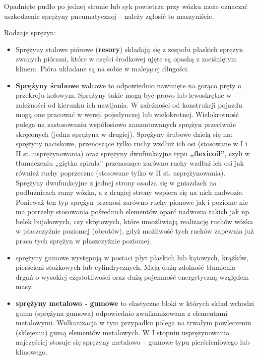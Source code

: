 \begin{tcolorbox}[colback=yellow!10!white,colframe=orange!80!black,title=Dla drużyny]
	Opadnięte pudło po jednej stronie lub syk powietrza przy wózku może oznaczać uszkodzenie sprężyny pneumatycznej – należy zgłosić to maszyniście.
\end{tcolorbox}

Rodzaje sprężyn:
\begin{itemize}
	\item Sprężyny stalowe piórowe (\textbf{resory}) składają się z zespołu płaskich sprężyn zwanych piórami, które w części środkowej ujęte są opaską z zaciśniętym klinem. Pióra układane są na sobie w malejącej długości.
	\item \textbf{Sprężyny śrubowe} walcowe to odpowiednio nawinięte na gorąco pręty o przekroju kołowym. Sprężyny takie mogą być prawo lub lewoskrętne w zależności od kierunku ich nawijania. 
	W zależności od konstrukcji pojazdu mogą one pracować w wersji pojedynczej lub wielokrotnej. Wielokrotność polega na zastosowaniu współosiowo zamontowanych sprężyn przeciwnie skręconych (jedna sprężyna w drugiej). 
	Sprężyny śrubowe dzielą się na: sprężyny naciskowe, przenoszące tylko ruchy wzdłuż ich osi (stosowane w I i II st. usprężynowania) oraz sprężyny dwufunkcyjne typu \textbf{„flexicoil”}, czyli w tłumaczeniu „giętka spirala” przenoszące zarówno ruchy wzdłuż ich osi jak również ruchy poprzeczne (stosowane tylko w II st. usprężynowania). 
	Sprężyny dwufunkcyjne z jednej strony osadza się w gniazdach na podłużnicach ramy wózka, a z drugiej strony wspiera się na nich nadwozie. Ponieważ ten typ sprężyn przenosi zarówno ruchy pionowe jak i poziome nie ma potrzeby stosowania pośrednich elementów oparć nadwozia takich jak np. belek bujakowych, czy skrętowych, które umożliwiają realizację ruchów wózka w płaszczyźnie poziomej (obrotów), gdyż możliwość tych ruchów zapewnia już praca tych sprężyn w płaszczyźnie poziomej.
	\item sprężyny gumowe występują w postaci płyt płaskich lub kątowych, krążków, pierścieni stożkowych lub cylindrycznych. Mają dużą zdolność tłumienia drgań o wysokiej częstotliwości oraz dużą pojemność energetyczną względem masy.
	\item \textbf{sprężyny metalowo - gumowe} to elastyczne bloki w których skład wchodzi guma (sprężyna gumowa) odpowiednio zwulkanizowana z elementami metalowymi. Wulkanizacja w tym przypadku polega na trwałym powleczeniu (sklejeniu) gumą elementów metalowych. 
	W I stopniu usprężynowania najczęściej stosuje się sprężyny metalowo – gumowe typu pierścieniowego lub klinowego. 

\end{itemize}
